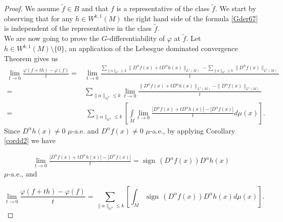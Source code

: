 \documentclass[10pt,a4paper]{amsart}
\DeclareMathOperator*{\sign}{sign\,}
\begin{document}
\begin{proof} %

We assume $\tilde{f}\in B$ and that $f$ is a representative of the class $\tilde{f}$. We start by observing that for any $h\in  W^{k,1}(M)$ the right hand side of the  formula \eqref{Gder67} is independent of the representative in the class $\tilde{f}$. \\
	
We are now going to prove the $G$-differentiability of $\varphi$ at $\tilde{f}$. Let $h\in  W^{k,1}(M)\setminus\{0\}$, an application of the  Lebesgue dominated convergence Theorem gives us
{\setlength\arraycolsep{0pt}
\begin{align*}
	\lim\limits_{t\rightarrow 0}\frac{\varphi(f+th)-\varphi(f)}{t}=& \lim\limits_{t\rightarrow 0} \frac{\sum\limits_{\|\alpha\|_{\mathbb{N}^{n}}\leq k}  \|D^{\alpha}f(x)+tD^{\alpha}h(x)\|_{L^{1}(M)}-\sum\limits_{\|\alpha\|_{\mathbb{N}^{n}}\leq k}  \|D^{\alpha}f(x)\|_{L^{1}(M)}}{t}\\
=&\sum\limits_{\|\alpha\|_{\mathbb{N}^{n}}\leq k}\lim\limits_{t\rightarrow 0}\frac{  \|D^{\alpha}f(x)+tD^{\alpha}h(x)\|_{L^{1}(M)}-  \|D^{\alpha}f(x)\|_{L^{1}(M)}}{t}\\
=&\ \sum\limits_{\|\alpha\|_{\mathbb{N}^{n}}\leq k}\left[  \int\limits_{M}\lim\limits_{t\rightarrow 0}\frac{  |D^{\alpha}f(x)+tD^{\alpha}h(x)|-|D^{\alpha}f(x)|}{t}d\mu(x)\right].
	 	\end{align*}} 
Since $D^{\alpha}h(x)\neq 0$ $\mu$-a.e. and  $D^{\alpha}f(x)\neq 0$ $\mu$-a.e., by applying Corollary \ref{cordd2} we have

	\begin{align*}
\lim\limits_{t\rightarrow 0}\frac{  |D^{\alpha}f(x)+tD^{\alpha}h(x)|-|D^{\alpha}f(x)|}{t}=\sign(D^{\alpha}f(x))D^{\alpha}h(x)
	\end{align*}
$\mu$-a.e., and

 \[\lim\limits_{t\rightarrow 0}\frac{\varphi(f+th)-\varphi(f)}{t}=\sum\limits_{\|\alpha\|_{\mathbb{N}^{n}}\leq k}\left[ \int_{M  } \sign(D^{\alpha}f(x))D^{\alpha}h(x) d\mu(x)\right].\]
	

\end{proof}
\end{document}
